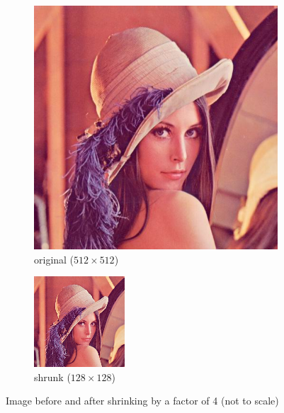 \documentclass[12pt]{article}
\theoremstyle{definition}
\newcommand{\subfiguresize}{.3\textwidth}
\begin{document}
\begin{figure}[H]\centering
    \begin{subfigure}[t]{\subfiguresize}\centering
        \includegraphics[width=\textwidth]{lenac.png}
        \caption{original ($512 \times 512$)}
    \end{subfigure}
    \hspace{.05\textwidth}
    \begin{subfigure}[t]{\subfiguresize}\centering
        \includegraphics[width=.7\textwidth]{lenac_small.png}
        \caption{shrunk ($128 \times 128$)}
    \end{subfigure}
    \caption{Image before and after shrinking by a factor of 4 (not to scale)}
\end{figure}
\end{document}
